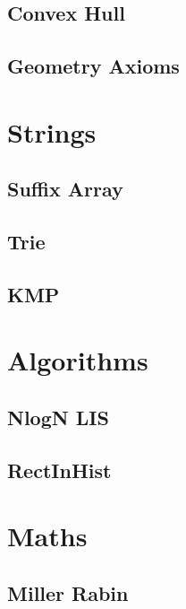 \documentclass[twocolumn]{article}
\begin{document}
        \subsection{Convex Hull}
        
        \subsection{Geometry Axioms}
        

    \newpage
    \section{Strings}
        \subsection{Suffix Array}
        
        \subsection{Trie}
        
        \subsection{KMP}
        


    \newpage
    \section{Algorithms}
        \subsection{NlogN LIS}
        
        \subsection{RectInHist}
        

    \newpage
    \section{Maths}
        \subsection{Miller Rabin}
        
\end{document}
